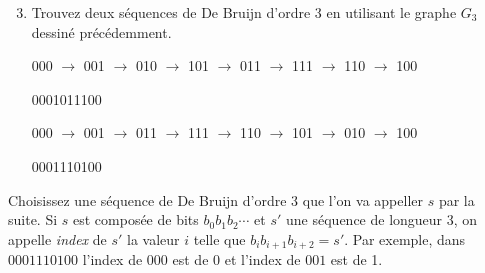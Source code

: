 \documentclass[11pt]{article}
\begin{document}
\begin{enumerate}
\setcounter{enumi}{2}
\item Trouvez deux séquences de De Bruijn d'ordre 3 en utilisant
le graphe $G_3$ dessiné précédemment.


\begin{solution}

000 $\rightarrow$ 001 $\rightarrow$ 010 $\rightarrow$ 101 $\rightarrow$ 011
$\rightarrow$ 111 $\rightarrow$ 110 $\rightarrow$ 100

0001011100

000 $\rightarrow$ 001 $\rightarrow$ 011 $\rightarrow$ 111 $\rightarrow$ 110
$\rightarrow$ 101 $\rightarrow$ 010 $\rightarrow$ 100

0001110100

\end{solution}
\end{enumerate}


Choisissez une séquence de De Bruijn d'ordre 3 que l'on va appeller $s$
par la suite. Si $s$ est composée de bits $b_0b_1b_2\cdots$ et $s'$ une
séquence de longueur 3, on appelle \emph{index} de $s'$ la valeur $i$
telle que $b_ib_{i+1}b_{i+2}=s'$. Par exemple, dans $0001110100$ l'index
de $000$ est de 0 et l'index de $001$ est de 1.
\end{document}

